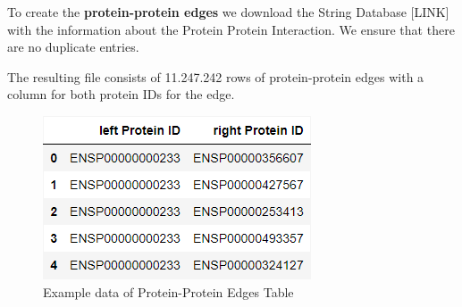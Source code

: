 To create the \textbf{protein-protein edges} we download the String Database [LINK] with the information about the Protein Protein Interaction.
We ensure that there are no duplicate entries.

The resulting file consists of 11.247.242 rows of protein-protein edges with a column for both protein IDs for the edge.
\begin{figure}[h]
\centering
\includegraphics[height=\dfheight]{figures/03_02_protein_edges}
\caption{Example data of Protein-Protein Edges Table}
\label{fig:03_02_df_protein_edges}
\end{figure}


